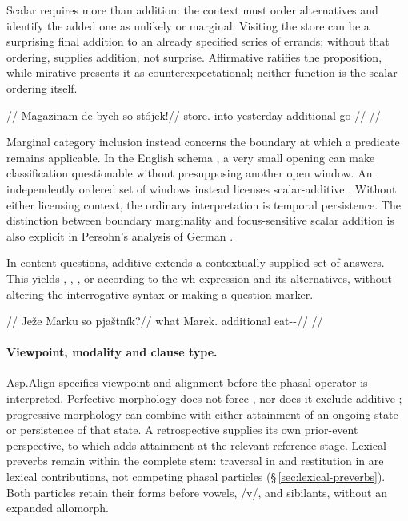 Scalar  requires more than addition: the context must order
alternatives and identify the added one as unlikely or marginal. Visiting the
store can be a surprising final addition to an already specified series of
errands; without that ordering,  supplies addition, not surprise.
Affirmative  ratifies the proposition, while mirative 
presents it as counterexpectational; neither function is the scalar ordering
itself.

\pex
\begingl
\glpreamble {}//
\gla Magazinam de bych so stójek!//
\glb store.\Ind{} into yesterday additional go-\Pf{}//
\glft {}//
\endgl
\xe

Marginal category inclusion instead concerns the boundary at which a predicate
remains applicable. In the English schema , a very small opening can make classification questionable
without presupposing another open window. An independently ordered set of
windows instead licenses scalar-additive . Without either licensing context, the ordinary interpretation is
temporal persistence.
The distinction between boundary marginality and focus-sensitive scalar
addition is also explicit in Persohn's analysis of German
\cite[§§4.1--4.2]{persohn2024scalar}.

In content questions, additive  extends a contextually supplied set of
answers. This yields , , ,
or  according to the wh-expression and its alternatives,
without altering the interrogative syntax or making  a question marker.

\pex
\begingl
\glpreamble {}//
\gla Ježe Marku so pjaštník?//
\glb what Marek.\Trs{} additional eat-\Trs{}-\Pf{}//
\glft {}//
\endgl
\xe

\paragraph{Viewpoint, modality and clause type.}
Asp.Align specifies viewpoint and alignment before the phasal operator is
interpreted. Perfective morphology does not force , nor does it
exclude additive ; progressive morphology can combine with either
attainment of an ongoing state or persistence of that state. A retrospective
supplies its own prior-event perspective, to which  adds attainment
at the relevant reference stage. Lexical preverbs remain within the complete
stem: traversal in  and restitution in  are
lexical contributions, not competing phasal particles
(§\,\ref{sec:lexical-preverbs}). Both particles retain their forms before
vowels, /v/, and sibilants, without an expanded allomorph.

